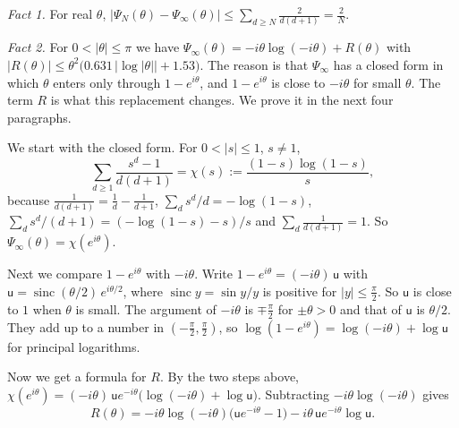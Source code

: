 \emph{Fact 1.} For real $\theta$,
$\lvert\Psi_N(\theta)-\Psi_\infty(\theta)\rvert\le\sum_{d\ge N}\frac2{d(d+1)}=\frac2N$.

\emph{Fact 2.} For $0<\lvert\theta\rvert\le\pi$ we have
$\Psi_\infty(\theta)=-i\theta\log(-i\theta)+R(\theta)$ with
$\lvert R(\theta)\rvert\le\theta^2\bigl(0.631\,\lvert\log\lvert\theta\rvert\rvert+1.53\bigr)$.
The reason is that $\Psi_\infty$ has a closed form in which $\theta$
enters only through $1-e^{i\theta}$, and $1-e^{i\theta}$ is close to
$-i\theta$ for small $\theta$. The term $R$ is what this replacement
changes. We prove it in the next four paragraphs.

We start with the closed form. For $0<\lvert s\rvert\le1$, $s\ne1$,
\[
 \sum_{d\ge1}\frac{s^d-1}{d(d+1)}=\chi(s):=\frac{(1-s)\log(1-s)}s,
\]
because $\frac1{d(d+1)}=\frac1d-\frac1{d+1}$, $\sum_ds^d/d=-\log(1-s)$,
$\sum_ds^d/(d+1)=(-\log(1-s)-s)/s$ and $\sum_d\frac1{d(d+1)}=1$. So
$\Psi_\infty(\theta)=\chi(e^{i\theta})$.

Next we compare $1-e^{i\theta}$ with $-i\theta$. Write
$1-e^{i\theta}=(-i\theta)\,\mathsf u$ with
$\mathsf u=\operatorname{sinc}(\theta/2)\,e^{i\theta/2}$, where
$\operatorname{sinc}y=\sin y/y$ is positive for $\lvert y\rvert\le\frac\pi2$.
So $\mathsf u$ is close to $1$ when $\theta$ is small. The argument of
$-i\theta$ is $\mp\frac\pi2$ for $\pm\theta>0$ and that of $\mathsf u$ is
$\theta/2$. They add up to a number in $(-\frac\pi2,\frac\pi2)$, so
$\log(1-e^{i\theta})=\log(-i\theta)+\log\mathsf u$ for principal logarithms.

Now we get a formula for $R$. By the two steps above,
$\chi(e^{i\theta})=(-i\theta)\,\mathsf ue^{-i\theta}\bigl(\log(-i\theta)+\log\mathsf u\bigr)$.
Subtracting $-i\theta\log(-i\theta)$ gives
\[
 R(\theta)=-i\theta\log(-i\theta)\bigl(\mathsf ue^{-i\theta}-1\bigr)
 -i\theta\,\mathsf ue^{-i\theta}\log\mathsf u .
\]

